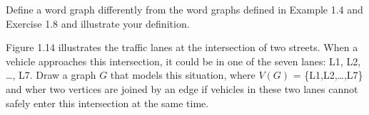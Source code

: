 \begin{exer}
Define a word graph differently from the word graphs defined in Example 1.4 and Exercise 1.8 and illustrate your definition.
\end{exer}

\begin{exer}


Figure 1.14 illustrates the traffic lanes at the intersection of two streets. When a vehicle approaches this intersection, it could be in one of the seven lanes: L1, L2, \ldots, L7. Draw a graph $G$ that models this situation, where $V(G)$ = \{L1,L2,\ldots,L7\} and wher two vertices are joined by an edge if vehicles in these two lanes cannot safely enter this intersection at the same time.
\end{exer}